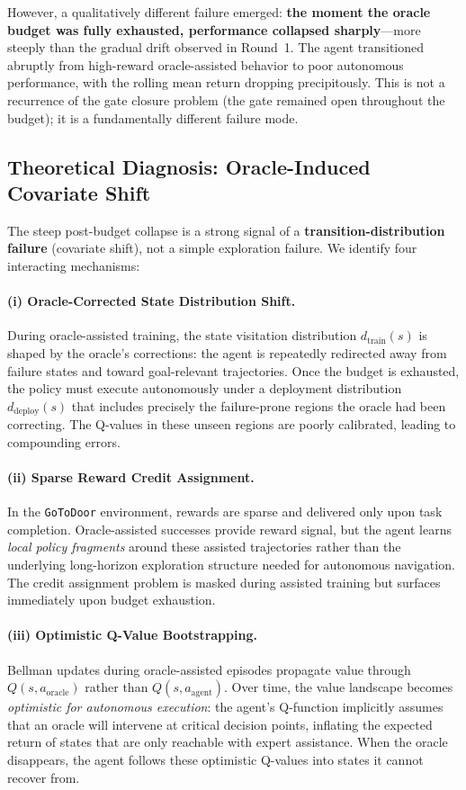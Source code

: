 \documentclass[11pt, a4paper]{article}
\begin{document}
However, a qualitatively different failure emerged: \textbf{the moment the oracle budget was fully exhausted, performance collapsed sharply}---more steeply than the gradual drift observed in Round~1. The agent transitioned abruptly from high-reward oracle-assisted behavior to poor autonomous performance, with the rolling mean return dropping precipitously. This is not a recurrence of the gate closure problem (the gate remained open throughout the budget); it is a fundamentally different failure mode.


\subsection{Theoretical Diagnosis: Oracle-Induced Covariate Shift}
\label{sec:dagger}

The steep post-budget collapse is a strong signal of a \textbf{transition-distribution failure} (covariate shift), not a simple exploration failure. We identify four interacting mechanisms:

\paragraph{(i) Oracle-Corrected State Distribution Shift.}
During oracle-assisted training, the state visitation distribution $d_{\mathrm{train}}(s)$ is shaped by the oracle's corrections: the agent is repeatedly redirected away from failure states and toward goal-relevant trajectories. Once the budget is exhausted, the policy must execute autonomously under a deployment distribution $d_{\mathrm{deploy}}(s)$ that includes precisely the failure-prone regions the oracle had been correcting. The Q-values in these unseen regions are poorly calibrated, leading to compounding errors.

\paragraph{(ii) Sparse Reward Credit Assignment.}
In the \texttt{GoToDoor} environment, rewards are sparse and delivered only upon task completion. Oracle-assisted successes provide reward signal, but the agent learns \textit{local policy fragments} around these assisted trajectories rather than the underlying long-horizon exploration structure needed for autonomous navigation. The credit assignment problem is masked during assisted training but surfaces immediately upon budget exhaustion.

\paragraph{(iii) Optimistic Q-Value Bootstrapping.}
Bellman updates during oracle-assisted episodes propagate value through $Q(s, a_{\mathrm{oracle}})$ rather than $Q(s, a_{\mathrm{agent}})$. Over time, the value landscape becomes \textit{optimistic for autonomous execution}: the agent's Q-function implicitly assumes that an oracle will intervene at critical decision points, inflating the expected return of states that are only reachable with expert assistance. When the oracle disappears, the agent follows these optimistic Q-values into states it cannot recover from.
\end{document}
